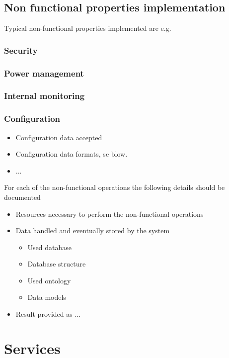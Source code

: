 \documentclass[a4paper]{arrowhead}
\begin{document}
\subsection {Non functional properties implementation}
\color{red}
Typical non-functional properties implemented are e.g.
\subsubsection {Security}
\subsubsection {Power management}
\subsubsection {Internal monitoring}
\subsubsection {Configuration}
  \begin{itemize}
  \item Configuration data accepted
  \item Configuration data formats, se blow.
  \item ...  
  \end{itemize}  

For each of the non-functional operations the following details
should be documented 

\begin{itemize}
  \item Resources necessary to perform the non-functional operations
  \item Data handled and eventually stored by the system
    \begin{itemize}
    \item Used database
    \item Database structure
    \item Used ontology
    \item Data models
    \end{itemize}
  \item Result provided as ...
  \end{itemize}
\color{black}




\newpage

\section{Services}
\label{sec:services}
\end{document}
